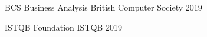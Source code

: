 
\begin{sloppypar} %
\small %
\begin{cvhonors}

  \cvhonor
    {BCS Business Analysis} 
    {British Computer Society} 
    {} %
    {2019}

\cvhonor
    {ISTQB Foundation} 
    {ISTQB} 
    {} 
    {2019}

\end{cvhonors}
\normalsize
\end{sloppypar}

